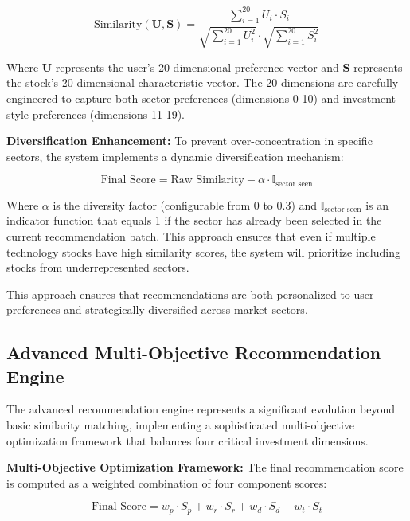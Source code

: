 \begin{equation}
\text{Similarity}(\mathbf{U}, \mathbf{S}) = \frac{\sum_{i=1}^{20} U_i \cdot S_i}{\sqrt{\sum_{i=1}^{20} U_i^2} \cdot \sqrt{\sum_{i=1}^{20} S_i^2}}
\end{equation}

Where $\mathbf{U}$ represents the user's 20-dimensional preference vector and $\mathbf{S}$ represents the stock's 20-dimensional characteristic vector. The 20 dimensions are carefully engineered to capture both sector preferences (dimensions 0-10) and investment style preferences (dimensions 11-19).

\textbf{Diversification Enhancement:}
To prevent over-concentration in specific sectors, the system implements a dynamic diversification mechanism:

\begin{equation}
\text{Final Score} = \text{Raw Similarity} - \alpha \cdot \mathbb{I}_{\text{sector seen}}
\end{equation}

Where $\alpha$ is the diversity factor (configurable from 0 to 0.3) and $\mathbb{I}_{\text{sector seen}}$ is an indicator function that equals 1 if the sector has already been selected in the current recommendation batch. This approach ensures that even if multiple technology stocks have high similarity scores, the system will prioritize including stocks from underrepresented sectors.

This approach ensures that recommendations are both personalized to user preferences and strategically diversified across market sectors.

\subsection{Advanced Multi-Objective Recommendation Engine}

The advanced recommendation engine represents a significant evolution beyond basic similarity matching, implementing a sophisticated multi-objective optimization framework that balances four critical investment dimensions.

\textbf{Multi-Objective Optimization Framework:}
The final recommendation score is computed as a weighted combination of four component scores:

\begin{equation}
\text{Final Score} = w_p \cdot S_p + w_r \cdot S_r + w_d \cdot S_d + w_t \cdot S_t
\end{equation}

